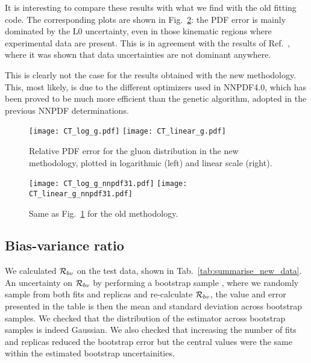 It is interesting to compare these results with what we find with the old fitting code. The corresponding
plots are shown in Fig.~\ref{fig:CT_uncertainty_g_nnpdf3.1}: the PDF error 
is mainly dominated by the L0 uncertainty, even in those kinematic regions where experimental data are present.
This is in agreement with the results of Ref.~\cite{nnpdf30}, where it was shown that 
data uncertainties are not dominant anywhere.

This is clearly not the case for the results obtained with the new methodology.
This, most likely, is due to the different optimizers used in NNPDF4.0, which has been proved to be much more efficient 
than the genetic algorithm, adopted in the previous NNPDF determinations.

\begin{figure}[ht]
    \centering
    \texttt{[image: CT\_log\_g.pdf]}
    \texttt{[image: CT\_linear\_g.pdf]}
    \caption{Relative PDF error for the gluon distribution in the new methodology,
    plotted in logarithmic (left) and linear scale (right).}
    \label{fig:CT_uncertainty_g}    
\end{figure}

\begin{figure}[ht]
    \centering
    \texttt{[image: CT\_log\_g\_nnpdf31.pdf]}
    \texttt{[image: CT\_linear\_g\_nnpdf31.pdf]}
    \caption{Same as Fig.~\ref{fig:CT_uncertainty_g} for the old methodology.}
    \label{fig:CT_uncertainty_g_nnpdf3.1}    
\end{figure}


\subsection{Bias-variance ratio}

We calculated $\mathcal{R}_{bv}$ on the test data, shown in
Tab.~\ref{tab:summarise_new_data}. An
uncertainty on $\mathcal{R}_{bv}$ by performing a bootstrap sample
\cite{efron1994introduction},
where we randomly sample from both fits and replicas and re-calculate
$\mathcal{R}_{bv}$, the value and error presented in the table is then the mean
and standard deviation across bootstrap samples. We checked that the distribution
of the estimator across bootstrap samples is indeed Gaussian. We also checked
that increasing the number of fits and replicas reduced the bootstrap error but
the central values were the same within the estimated bootstrap uncertainities.

